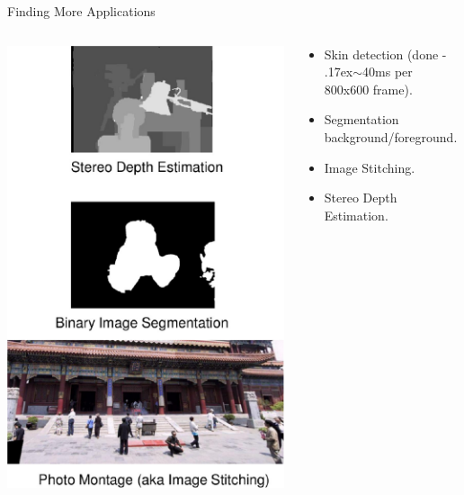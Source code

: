 \documentclass{beamer}
\begin{document}
\begin{frame}{Finding More Applications}
\begin{columns}
\begin{column}{4cm}
   \includegraphics[width=1.0\textwidth]{apps} 
\end{column}
\begin{column}{6cm}
\begin{itemize}
\item
Skin detection (done - {\raise.17ex\hbox{$\scriptstyle\mathtt{\sim}$}}40ms per 800x600 frame).
\item
Segmentation background/foreground.
\item
Image Stitching.
\item
Stereo Depth Estimation.
\end{itemize}
\end{column}
\end{columns}
\end{frame}
\end{document}

